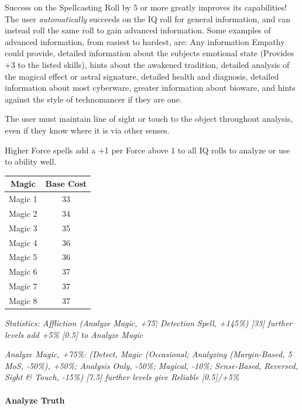 \begin{multicols*}{3}
	Success on the Spellcasting Roll by 5 or more greatly improves its capabilities! The user \textit{automatically} succeeds on the IQ roll for general information, and can instead roll the same roll to gain advanced information. Some examples of advanced information, from easiest to hardest, are: Any information Empathy could provide, detailed information about the subjects emotional state (Provides +3 to the listed skills), hints about the awakened tradition, detailed analysis of the magical effect or astral signature, detailed health and diagnosis, detailed information about most cyberware, greater information about bioware, and hints against the style of technomancer if they are one.
	
	The user must maintain line of sight or touch to the object throughout analysis, even if they know where it is via other senses.
	
	Higher Force spells add a +1 per Force above 1 to all IQ rolls to analyze or use to ability well.
	
	\begin{center}
		\begin{tabular}{|c|c|}
			\hline
			Magic & Base Cost \\
			\hline
			\hline
			Magic 1 & 33 \\
			Magic 2 & 34 \\
			Magic 3 & 35 \\
			Magic 4 & 36 \\
			Magic 5 & 36 \\
			Magic 6 & 37 \\
			Magic 7 & 37 \\
			Magic 8 & 37 \\
			\hline
		\end{tabular}
	\end{center}
	
	\textcolor{OliveGreen}{\textit{ Statistics: Affliction (Analyze Magic, +75\^; Detection Spell, +145\%) [33] further levels add +5\% [0.5] to Analyze Magic}}
	
	\textcolor{OliveGreen}{\textit{Analyze Magic, +75\%: (Detect, Magic (Occasional; Analyzing (Margin-Based, 5 MoS, -50\%), +50\%; Analysis Only, -50\%; Magical, -10\%; Sense-Based, Reversed, Sight \& Touch, -15\%) [7.5] further levels give Reliable [0.5]/+5\%}}
	
	\paragraph{Analyze Truth}
	

\end{multicols*}
